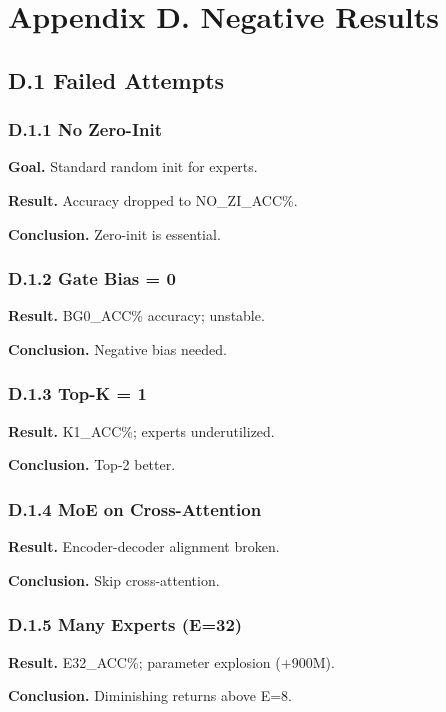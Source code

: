 \section{Appendix D. Negative Results}

\subsection{D.1 Failed Attempts}

\subsubsection{D.1.1 No Zero-Init}

\textbf{Goal.} Standard random init for experts.

\textbf{Result.} Accuracy dropped to {{NO\_ZI\_ACC}}\%.

\textbf{Conclusion.} Zero-init is essential.

\subsubsection{D.1.2 Gate Bias = 0}

\textbf{Result.} {{BG0\_ACC}}\% accuracy; unstable.

\textbf{Conclusion.} Negative bias needed.

\subsubsection{D.1.3 Top-K = 1}

\textbf{Result.} {{K1\_ACC}}\%; experts underutilized.

\textbf{Conclusion.} Top-2 better.

\subsubsection{D.1.4 MoE on Cross-Attention}

\textbf{Result.} Encoder-decoder alignment broken.

\textbf{Conclusion.} Skip cross-attention.

\subsubsection{D.1.5 Many Experts (E=32)}

\textbf{Result.} {{E32\_ACC}}\%; parameter explosion (+900M).

\textbf{Conclusion.} Diminishing returns above E=8.

